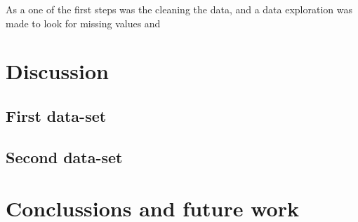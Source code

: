 \documentclass{article}
\begin{document}
As a one of the first steps was the cleaning the data, and a data exploration was made to look for missing values and 
\section{Discussion}
\subsection{First data-set}


\subsection{Second data-set}
\section{Conclussions and future work}
\citep{WEBER2019109}
\citep{article_1012052}


\end{document}
